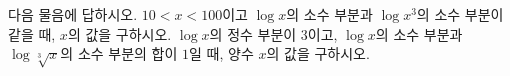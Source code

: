 다음 물음에 답하시오.
 $10<x<100$이고 $\log x$의 소수 부분과 $\log x^3$의 소수 부분이 같을 때, $x$의 값을 구하시오.
 $\log x$의 정수 부분이 $3$이고, $\log x$의 소수 부분과 $\log\sqrt[3]{x}$의 소수 부분의 합이 $1$일 때, 양수 $x$의 값을 구하시오.
